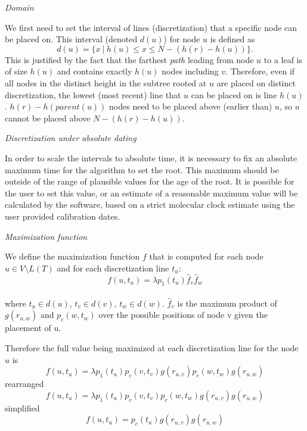 \documentclass[12pt,letterpaper]{article}
\renewcommand{\subsection}[1]{%
\bigskip
\begin{center}
\begin{large}
\normalfont\itshape #1
\end{large}
\end{center}}
\begin{document}
\subsection{Domain}
We first need to set the interval of lines (discretization) that a specific
node can be placed on.  This interval (denoted $d(u)$) for node $u$ is defined
as $$ d(u) = \{ x\ |\  h(u) \leq x \leq N - (h(r) - h(u))\}.$$
This is justified by the fact that the farthest {\em path} leading from node $u$ to a
leaf is of size $h(u)$ and contains exactly $h(u)$ nodes including $v$.
Therefore, even if all nodes in the distinct height in the subtree rooted at
$u$ are placed on distinct discretization, the lowest (most recent) line that $u$ can be
placed on is line $h(u)$.
$h(r) - h(parent(u))$ nodes need to be placed above (earlier than) $u$, so $u$ cannot
be placed above $N - (h(r) - h(u))$.

\subsection{Discretization under absolute dating}
In order to scale the intervals to absolute time, 
it is necessary to fix an absolute maximum time for the algorithm to set the root.
This maximum should be outside of the range of plausible values for the age of the root.
It is possible for the user to set this value, or an 
estimate of a reasonable maximum value will be calculated by the software, 
based on a strict molecular clock estimate using the user provided calibration dates.

\subsection{Maximization function}
We define the maximization function $f$ that is computed for each node $u \in
V\setminus L(T)$ and for each discretization line $t_u$:  
$$f(u,t_u) = \lambda p_1(t_u) \hat{f}_v \hat{f}_w $$\\ 
where $t_u \in d(u)$, $t_v \in d(v)$, $t_w \in
d(w)$.
$\hat{f}_v$ is the maximum product of $g(r_{u,w})$ and $p_c(w,t_w)$
over the possible positions of node v given the placement of u.

Therefore the full value being maximized at each discretization line for the node $u$
is 
$$f(u,t_u) = \lambda p_1(t_u) p_c(v,t_v) g(r_{u,v}) p_c(w,t_w) g(r_{u,w})$$
rearranged
$$f(u,t_u) = \lambda p_1(t_u) p_c(v,t_v)  p_c(w,t_w) g(r_{u,v}) g(r_{u,w})$$
simplified
$$f(u,t_u) = p_c(t_u) g(r_{u,v}) g(r_{u,w})$$
\end{document}
